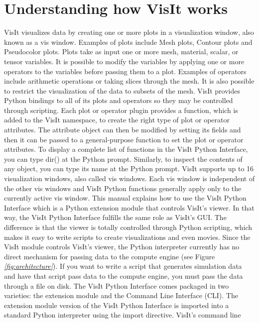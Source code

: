 \documentclass[letterpaper,10pt,english]{sphinxmanual}
\begin{document}
\section{Understanding how VisIt works}
\label{intro:understanding-how-visit-works}
VisIt visualizes data by creating one or more plots in a visualization
window, also known as a vis window. Examples of plots include Mesh
plots, Contour plots and Pseudocolor plots. Plots take as input one or
more mesh, material, scalar, or tensor variables. It is possible to
modify the variables by applying one or more operators to the variables
before passing them to a plot. Examples of operators include arithmetic
operations or taking slices through the mesh. It is also possible to
restrict the visualization of the data to subsets of the mesh. VisIt
provides Python bindings to all of its plots and operators so they may
be controlled through scripting. Each plot or operator plugin provides a
function, which is added to the VisIt namespace, to create the right
type of plot or operator attributes. The attribute object can then be
modified by setting its fields and then it can be passed to a
general-purpose function to set the plot or operator attributes. To
display a complete list of functions in the VisIt Python Interface, you
can type dir() at the Python prompt. Similarly, to inspect the contents
of any object, you can type its name at the Python prompt. VisIt
supports up to 16 visualization windows, also called vis windows. Each
vis window is independent of the other vis windows and VisIt Python
functions generally apply only to the currently active vis window. This
manual explains how to use the VisIt Python Interface which is a Python
extension module that controls VisIt’s viewer. In that way, the VisIt
Python Interface fulfills the same role as VisIt’s GUI. The difference
is that the viewer is totally controlled through Python scripting, which
makes it easy to write scripts to create visualizations and even movies.
Since the VisIt module controls VisIt’s viewer, the Python interpreter
currently has no direct mechanism for passing data to the compute engine
(see Figure {\hyperref[intro:fig:architecture]{\emph{{[}fig:architecture{]}}}}). If you want to
write a script that generates simulation data and have that script pass
data to the compute engine, you must pass the data through a file on
disk. The VisIt Python Interface comes packaged in two varieties: the
extension module and the Command Line Interface (CLI). The extension
module version of the VisIt Python Interface is imported into a standard
Python interpreter using the import directive. VisIt’s command line
\end{document}
